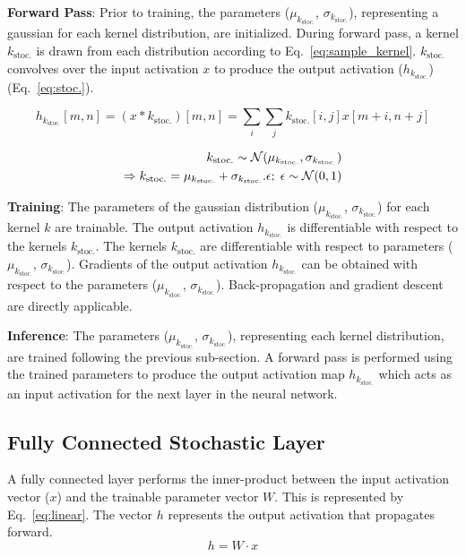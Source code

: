 \documentclass[12pt, letterpaper]{article}
\begin{document}
\textbf{Forward Pass}: Prior to training, the parameters ($\mu_{k_\mathrm{stoc.}}$, $\sigma_{k_\mathrm{stoc.}}$), representing a gaussian for each kernel distribution, are initialized. During forward pass, a kernel $k_\mathrm{stoc.}$ is drawn from each distribution according to Eq.~\eqref{eq:sample_kernel}. $k_\mathrm{stoc.}$ convolves over the input activation $x$ to produce the output activation ($h_{k_\mathrm{stoc.}}$) (Eq.~\eqref{eq:stoc.}).

\begin{equation}
  h_{k_\mathrm{stoc.}}[m,n]=(x * k_\mathrm{stoc.})[m,n]=\sum_i \sum_j k_\mathrm{stoc.}[i,j]x[m+i,n+j]
  \label{eq:stoc.}
\end{equation}
 
\begin{align}
  k_\mathrm{stoc.} \sim \mathcal{N}(\mu_{k_\mathrm{stoc.}},\sigma_{k_\mathrm{stoc.}}) \notag\\
  \Rightarrow k_\mathrm{stoc.}=\mu_{k_\mathrm{stoc.}} + \sigma_{k_\mathrm{stoc.}}.\epsilon;\; \epsilon \sim \mathcal{N}(0,1)
  \label{eq:sample_kernel}
\end{align}

\textbf{Training}: The parameters of the gaussian distribution ($\mu_{k_\mathrm{stoc.}}$, $\sigma_{k_\mathrm{stoc.}}$) for each kernel $k$ are trainable. The output activation $h_{k_\mathrm{stoc.}}$ is differentiable with respect to the kernels $k_\mathrm{stoc.}$. The kernels $k_\mathrm{stoc.}$ are differentiable with respect to parameters ($\mu_{k_\mathrm{stoc.}}$, $\sigma_{k_\mathrm{stoc.}}$). Gradients of the output activation $h_{k_\mathrm{stoc.}}$ can be obtained with respect to the parameters ($\mu_{k_\mathrm{stoc.}}$, $\sigma_{k_\mathrm{stoc.}}$). Back-propagation and gradient descent are directly applicable. 

\textbf{Inference}:
The parameters ($\mu_{k_\mathrm{stoc.}}$, $\sigma_{k_\mathrm{stoc.}}$), representing each kernel distribution, are trained following the previous sub-section.
A forward pass is performed using the trained parameters to produce the output activation map $h_{k_\mathrm{stoc.}}$%
which acts as an input activation for the next layer in the neural network.

\subsection{Fully Connected Stochastic Layer}
A fully connected layer performs the inner-product between the input activation vector ($x$) and the trainable parameter vector $W$.
This is represented by Eq.~\eqref{eq:linear}. The vector $h$ represents the output activation that propagates forward.
\begin{equation}
h=W \cdot x
    \label{eq:linear}
\end{equation}
\end{document}
